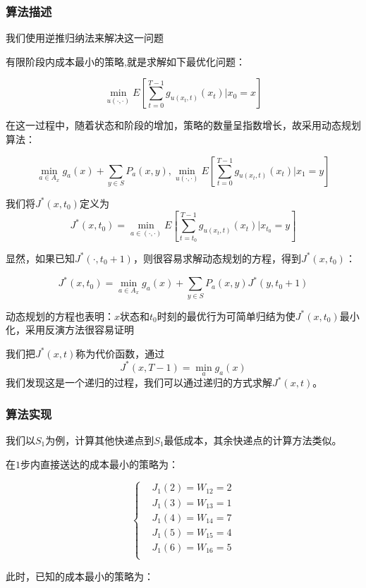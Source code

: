 \documentclass[UTF8]{ctexart}
\begin{document}
\subsubsection{算法描述}

我们使用逆推归纳法来解决这一问题

有限阶段内成本最小的策略,就是求解如下最优化问题：

$$\min_{u(\cdot, \cdot )}E[\sum_{t=0}^{T-1}g_{u(x_t,t)}(x_t)|x_0=x]$$

在这一过程中，随着状态和阶段的增加，策略的数量呈指数增长，故采用动态规划算法：

$$\min_{a\in A_x}{g_a(x)+\sum_{y\in S}^{}P_a(x,y)},\min_{u(\cdot, \cdot )}E[\sum_{t=0}^{T-1}g_{u(x_t,t)}(x_t)|x_1=y]$$

我们将$J^*(x,t_0)$定义为$$J^*(x,t_0)=\min_{a\in (\cdot, \cdot )} E[\sum_{t=t_0}^{T-1}g_{u(x_t,t)}(x_t)|x_{t_0}=y]$$

显然，如果已知$J^*(\cdot,t_0+1)$，则很容易求解动态规划的方程，得到$J^*(x,t_0)$：

$$J^*(x,t_0)=\min_{a\in A_x}{g_a(x)+\sum_{y\in S}^{}P_a(x,y)J^*(y,t_0+1)}$$

动态规划的方程也表明：$x$状态和$t_0$时刻的最优行为可简单归结为使$J^*(x,t_0)$最小化，采用反演方法很容易证明

我们把$J^*(x,t)$称为代价函数，通过$$J^*(x,T-1)=\min_a g_a(x)$$我们发现这是一个递归的过程，我们可以通过递归的方式求解$J^*(x,t)$。

\subsubsection{算法实现}

我们以$S_1$为例，计算其他快递点到$S_1$最低成本，其余快递点的计算方法类似。

在$1$步内直接送达的成本最小的策略为：

\begin{equation*}
    \left\{
    \begin{aligned}
        &J_1(2)=W_{12}=2 \\
        &J_1(3)=W_{13}=1 \\
        &J_1(4)=W_{14}=7 \\
        &J_1(5)=W_{15}=4 \\
        &J_1(6)=W_{16}=5 \\
    \end{aligned}
    \right.
\end{equation*}

此时，已知的成本最小的策略为：
\end{document}

